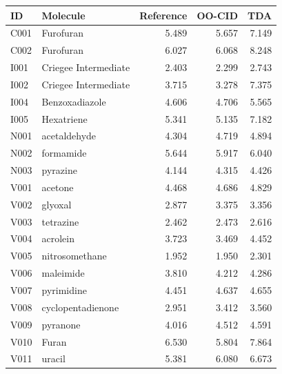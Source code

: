 \begin{tabular}{llrrr}\toprule
ID & Molecule & Reference & OO-CID & TDA \\ \midrule
C001 & Furofuran & 5.489 & 5.657 & 7.149 \\
C002 & Furofuran & 6.027 & 6.068 & 8.248 \\
I001 & Criegee Intermediate & 2.403 & 2.299 & 2.743 \\
I002 & Criegee Intermediate & 3.715 & 3.278 & 7.375 \\
I004 & Benzoxadiazole & 4.606 & 4.706 & 5.565 \\
I005 & Hexatriene & 5.341 & 5.135 & 7.182 \\
N001 & acetaldehyde & 4.304 & 4.719 & 4.894 \\
N002 & formamide & 5.644 & 5.917 & 6.040 \\
N003 & pyrazine & 4.144 & 4.315 & 4.426 \\
V001 & acetone & 4.468 & 4.686 & 4.829 \\
V002 & glyoxal & 2.877 & 3.375 & 3.356 \\
V003 & tetrazine & 2.462 & 2.473 & 2.616 \\
V004 & acrolein & 3.723 & 3.469 & 4.452 \\
V005 & nitrosomethane & 1.952 & 1.950 & 2.301 \\
V006 & maleimide & 3.810 & 4.212 & 4.286 \\
V007 & pyrimidine & 4.451 & 4.637 & 4.655 \\
V008 & cyclopentadienone & 2.951 & 3.412 & 3.560 \\
V009 & pyranone & 4.016 & 4.512 & 4.591 \\
V010 & Furan & 6.530 & 5.804 & 7.864 \\
V011 & uracil & 5.381 & 6.080 & 6.673 \\
\bottomrule\end{tabular}
